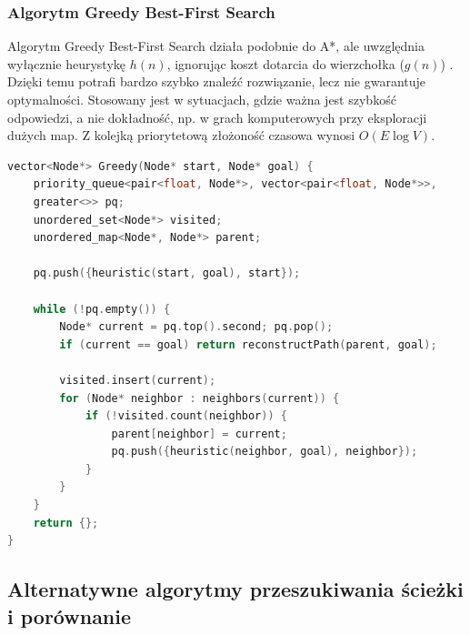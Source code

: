 \documentclass[a4paper,12pt]{book} %
\begin{document}
\subsubsection*{Algorytm Greedy Best-First Search}
Algorytm Greedy Best-First Search działa podobnie do A*, ale uwzględnia wyłącznie heurystykę \(h(n)\), ignorując koszt dotarcia do wierzchołka (\(g(n)\)) \cite{AI}. 
Dzięki temu potrafi bardzo szybko znaleźć rozwiązanie, lecz nie gwarantuje optymalności. 
Stosowany jest w sytuacjach, gdzie ważna jest szybkość odpowiedzi, a nie dokładność, np. w grach komputerowych przy eksploracji dużych map. Z kolejką priorytetową złożoność czasowa wynosi \(O(E \log V)\).

\begin{lstlisting}[language=C++, caption={Przykład algorytmu Greedy Best-First Search}, label={lst:greedy}]
vector<Node*> Greedy(Node* start, Node* goal) {
    priority_queue<pair<float, Node*>, vector<pair<float, Node*>>, 
    greater<>> pq;
    unordered_set<Node*> visited;
    unordered_map<Node*, Node*> parent;

    pq.push({heuristic(start, goal), start});

    while (!pq.empty()) {
        Node* current = pq.top().second; pq.pop();
        if (current == goal) return reconstructPath(parent, goal);

        visited.insert(current);
        for (Node* neighbor : neighbors(current)) {
            if (!visited.count(neighbor)) {
                parent[neighbor] = current;
                pq.push({heuristic(neighbor, goal), neighbor});
            }
        }
    }
    return {};
}
\end{lstlisting}

\subsection{Alternatywne algorytmy przeszukiwania ścieżki i porównanie}
\end{document}
